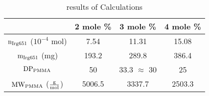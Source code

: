     \begin{table}[H]
        \centering
        \begin{tabular}{c|c|c|c}
            & 2 mole \% & 3 mole \% & 4 mole \%\\ \hline
            $\mathtext[Irg651]{n}$ ($10^{-4}$ mol) & 7.54 & 11.31 & 15.08 \\
            $\mathtext[Irg651]{m}$ (mg) & 193.2 & 289.8 & 386.4 \\
            $\mathtext[PMMA]{DP}$ & 50 & 33.3 $\approx$ 30 & 25\\
            $\mathtext[PMMA]{MW}$ ($\MW$) & 5006.5 & 3337.7 & 2503.3
        \end{tabular}
        \caption{results of Calculations}
        \label{tab:calcs1}
    \end{table}